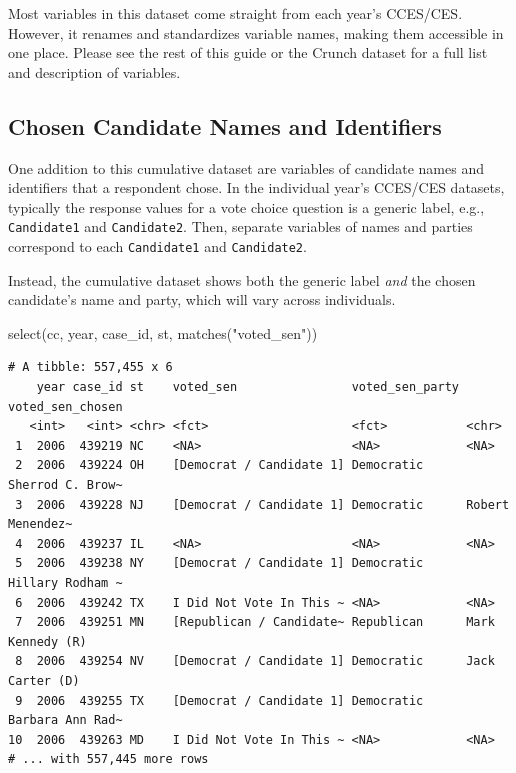 \documentclass[10pt,article,oneside]{memoir}
\theoremstyle{definition}
\newenvironment{Shaded}{\begin{snugshade}}{\end{snugshade}}
\newcommand{\FunctionTok}[1]{\textcolor[rgb]{0.00,0.00,0.00}{#1}}
\newcommand{\NormalTok}[1]{#1}
\newcommand{\StringTok}[1]{\textcolor[rgb]{0.31,0.60,0.02}{#1}}
\begin{document}
Most variables in this dataset come straight from each year's CCES/CES.
However, it renames and standardizes variable names, making them
accessible in one place. Please see the rest of this guide or the Crunch
dataset for a full list and description of variables.

\hypertarget{chosen-candidate-names-and-identifiers}{%
\subsection{Chosen Candidate Names and
Identifiers}\label{chosen-candidate-names-and-identifiers}}

One addition to this cumulative dataset are variables of candidate names
and identifiers that a respondent chose. In the individual year's
CCES/CES datasets, typically the response values for a vote choice
question is a generic label, e.g., \texttt{Candidate1} and
\texttt{Candidate2}. Then, separate variables of names and parties
correspond to each \texttt{Candidate1} and \texttt{Candidate2}.

Instead, the cumulative dataset shows both the generic label \emph{and}
the chosen candidate's name and party, which will vary across
individuals.

\begin{Shaded}
\begin{Highlighting}[]
\FunctionTok{select}\NormalTok{(cc, year, case\_id, st, }\FunctionTok{matches}\NormalTok{(}\StringTok{"voted\_sen"}\NormalTok{))}
\end{Highlighting}
\end{Shaded}

\begin{verbatim}
# A tibble: 557,455 x 6
    year case_id st    voted_sen                voted_sen_party voted_sen_chosen
   <int>   <int> <chr> <fct>                    <fct>           <chr>           
 1  2006  439219 NC    <NA>                     <NA>            <NA>            
 2  2006  439224 OH    [Democrat / Candidate 1] Democratic      Sherrod C. Brow~
 3  2006  439228 NJ    [Democrat / Candidate 1] Democratic      Robert Menendez~
 4  2006  439237 IL    <NA>                     <NA>            <NA>            
 5  2006  439238 NY    [Democrat / Candidate 1] Democratic      Hillary Rodham ~
 6  2006  439242 TX    I Did Not Vote In This ~ <NA>            <NA>            
 7  2006  439251 MN    [Republican / Candidate~ Republican      Mark Kennedy (R)
 8  2006  439254 NV    [Democrat / Candidate 1] Democratic      Jack Carter (D) 
 9  2006  439255 TX    [Democrat / Candidate 1] Democratic      Barbara Ann Rad~
10  2006  439263 MD    I Did Not Vote In This ~ <NA>            <NA>            
# ... with 557,445 more rows
\end{verbatim}
\end{document}
